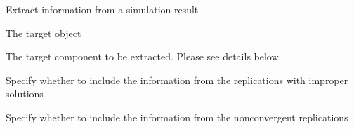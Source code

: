 \documentclass[a4paper]{book}
\begin{document}
%
\begin{Description}\relax
Extract information from a simulation result
\end{Description}
%
\begin{Arguments}
\begin{ldescription}
\item[\code{object}] 
The target  object

\item[\code{what}] 
The target component to be extracted. Please see details below.

\item[\code{improper}] 
Specify whether to include the information from the replications with improper solutions

\item[\code{nonconverged}] 
Specify whether to include the information from the nonconvergent replications

\end{ldescription}
\end{Arguments}
%
\end{document}
